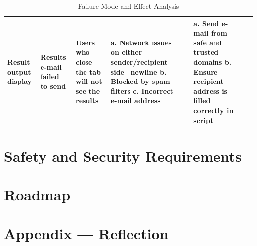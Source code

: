 \documentclass{article}
\begin{document}
\begin{landscape}
\begin{table}[ht]
{\begin{tabular}{|p{1.75cm}|p{4cm}|p{5cm}|p{5cm}|p{3cm}|p{5cm}|p{2cm}|p{2cm}|}
        \hline
        Result output display & Results e-mail failed to send & Users who close the tab will not see the results & a. Network issues on either sender/recipient side \ newline b. Blocked by spam filters \newline c. Incorrect e-mail address & & a. Send e-mail from safe and trusted domains b. Ensure recipient address is filled correctly in script & & \\
        \hline
        \end{tabular}
        } %
        \caption{Failure Mode and Effect Analysis}
        \label{table:fmea}
    \end{table}
\end{landscape}
   

\section{Safety and Security Requirements}


\section{Roadmap}


\newpage{}

\section*{Appendix --- Reflection}



\end{document}
